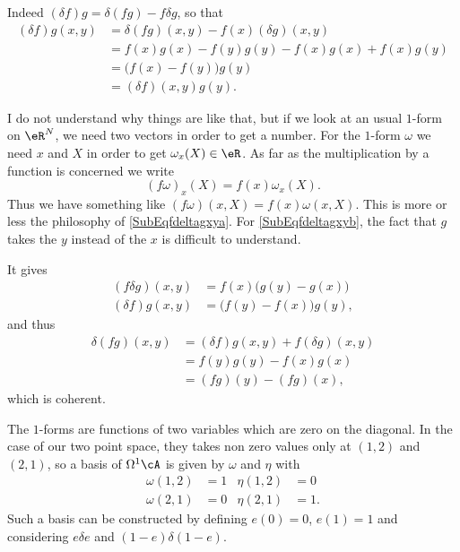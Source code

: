 Indeed $(\delta f)g=\delta(fg)-f\delta g$, so that
\begin{align*}
	(\delta f)g(x,y) & =\delta(fg)(x,y)-f(x)(\delta g)(x,y) \\
	                 & =f(x)g(x)-f(y)g(y)-f(x)g(x)+f(x)g(y) \\
	                 & =\big( f(x)-f(y) \big)g(y)           \\
	                 & =(\delta f)(x,y)g(y).
\end{align*}

\begin{probleme}
	I do not understand why things are like that, but if we look at an usual $1$-form on $\eR^N$, we need two vectors in order to get a number. For the $1$-form $\omega$ we need $x$ and $X$ in order to get $\omega_x(X)\in\eR$. As far as the multiplication by a function is concerned we write
	\[
		(f\omega)_{x}(X)=f(x)\omega_{x}(X).
	\]
	Thus we have something like $(f\omega)(x,X)=f(x)\omega(x,X)$. This is more or less the philosophy of \eqref{SubEqfdeltagxya}. For \eqref{SubEqfdeltagxyb}, the fact that $g$ takes the $y$ instead of the $x$ is difficult to understand.
\end{probleme}
It gives
\begin{subequations}
	\begin{align}
		(f\delta g)(x,y) & =f(x)\big( g(y)-g(x) \big)  \\
		(\delta f)g(x,y) & =\big( f(y)-f(x) \big)g(y),
	\end{align}
\end{subequations}
and thus
\begin{align*}
	\delta(fg)(x,y) & =(\delta f)g(x,y)+f(\delta g)(x,y) \\
	                & =f(y)g(y)-f(x)g(x)                 \\
	                & =(fg)(y)-(fg)(x),
\end{align*}
which is coherent.

The $1$-forms are functions of two variables which are zero on the diagonal. In the case of our two point space, they takes non zero values only at $(1,2)$ and $(2,1)$, so a basis of $\Omega^1\cA$ is given by $\omega$ and $\eta$ with
\begin{align}
	\omega(1,2) & =1 & \eta(1,2) & =0  \\
	\omega(2,1) & =0 & \eta(2,1) & =1.
\end{align}
Such a basis can be constructed by defining $e(0)=0$, $e(1)=1$ and considering $e\delta e$ and $(1-e)\delta(1-e)$.

